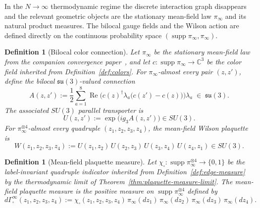 \documentclass[11pt]{article}
\newtheorem{definition}[theorem]{Definition}
\theoremstyle{remark}
\newcommand{\C}{\mathbb C}
\begin{document}
In the $N\to\infty$ thermodynamic regime the discrete interaction graph
disappears and the relevant geometric objects are the stationary mean-field law
$\pi_\infty$ and its natural product measures.
The bilocal gauge fields and the Wilson action are defined directly on the
continuous probability space
$(\operatorname{supp}\pi_\infty, \pi_\infty)$.

\begin{definition}[Bilocal color connection]
\label{def:bilocal-connection}
Let $\pi_\infty$ be the stationary mean-field law from the companion convergence
paper~\cite{convergence}, and let $c:\operatorname{supp}\pi_\infty\to\C^3$ be
the color field inherited from Definition~\ref{def:colors}.
For $\pi_\infty$-almost every pair $(z,z')$, define the
\emph{bilocal $\mathfrak{su}(3)$-valued connection}
\[
A(z,z')
:=
\frac12\sum_{a=1}^8
\operatorname{Re}\!\bigl(c(z)^\dagger\lambda_a\bigl(c(z')-c(z)\bigr)\bigr)\lambda_a
\;\in\;\mathfrak{su}(3).
\]
The associated $SU(3)$ parallel transporter is
\[
U(z,z'):=\exp\!\bigl(ig_3 A(z,z')\bigr)\in SU(3).
\]
For $\pi_\infty^{\otimes 4}$-almost every quadruple $(z_1,z_2,z_3,z_4)$, the
\emph{mean-field Wilson plaquette} is
\[
W(z_1,z_2,z_3,z_4)
:=U(z_1,z_2)\,U(z_2,z_3)\,U(z_3,z_4)\,U(z_4,z_1)\in SU(3).
\]
\end{definition}

\begin{definition}[Mean-field plaquette measure]
\label{def:mf-plaquette-measure}
Let $\chi_\square:\operatorname{supp}\pi_\infty^{\otimes 4}\to\{0,1\}$ be the
label-invariant quadruple indicator inherited from Definition~\ref{def:edge-measure}
by the thermodynamic limit of Theorem~\ref{thm:plaquette-measure-limit}.
The \emph{mean-field plaquette measure} is the positive measure on
$\operatorname{supp}\pi_\infty^{\otimes 4}$ defined by
\[
d\Gamma_\square^\infty(z_1,z_2,z_3,z_4)
:=
\chi_\square(z_1,z_2,z_3,z_4)\,
\pi_\infty(dz_1)\,\pi_\infty(dz_2)\,\pi_\infty(dz_3)\,\pi_\infty(dz_4).
\]
\end{definition}
\end{document}
